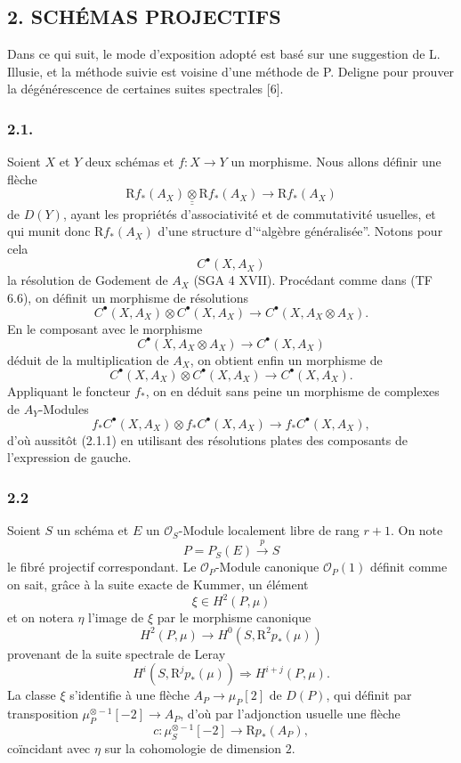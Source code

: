 \subsection*{2. SCHÉMAS PROJECTIFS}

Dans ce qui suit, le mode d'exposition adopté est basé sur une suggestion de L. Illusie, et la méthode suivie est voisine d'une méthode de P. Deligne pour prouver la dégénérescence de certaines suites spectrales [6].

\subsubsection*{2.1.}
Soient $X$ et $Y$ deux schémas et $f:X\to Y$ un morphisme. Nous allons définir une flèche
\[
\mathrm{R} f_*(A_X)\mathbin{\underline{\underline{\otimes}}} \mathrm{R} f_*(A_X)\longrightarrow \mathrm{R} f_*(A_X)
\tag{2.1.1}
\]
de $D(Y)$, ayant les propriétés d'associativité et de commutativité usuelles, et qui munit donc $\mathrm{R} f_*(A_X)$ d'une structure d'``algèbre généralisée''. Notons pour cela
\[
C^{\bullet}(X,A_X)
\]
la
résolution de Godement de $A_X$ (SGA 4 XVII). Procédant comme dans (TF 6.6), on définit un morphisme de résolutions
\[
C^{\bullet}(X,A_X)\otimes C^{\bullet}(X,A_X)\longrightarrow C^{\bullet}(X,A_X\otimes A_X).
\]
En le composant avec le morphisme
\[
C^{\bullet}(X,A_X\otimes A_X)\longrightarrow C^{\bullet}(X,A_X)
\]
déduit de la multiplication de $A_X$, on obtient enfin un morphisme de
\[
C^{\bullet}(X,A_X)\otimes C^{\bullet}(X,A_X)\longrightarrow C^{\bullet}(X,A_X).
\tag{2.1.2}
\]
Appliquant le foncteur $f_*$, on en déduit sans peine un morphisme de complexes de $A_Y$-Modules
\[
f_*C^{\bullet}(X,A_X)\otimes f_*C^{\bullet}(X,A_X)\longrightarrow f_*C^{\bullet}(X,A_X),
\]
d'où aussitôt (2.1.1) en utilisant des résolutions plates des composants de l'expression de gauche.

\subsubsection*{2.2}
Soient $S$ un schéma et $E$ un $\mathcal{O}_S$-Module localement libre de rang $r+1$. On note
\[
P=P_S(E)\xrightarrow{p}S
\]
le fibré projectif correspondant. Le $\mathcal{O}_P$-Module canonique $\mathcal{O}_P(1)$ définit comme on sait, grâce à la suite exacte de Kummer, un élément
\[
\xi\in H^2(P,\mu)
\]
et on notera $\eta$ l'image de $\xi$ par le morphisme canonique
\[
H^2(P,\mu)\longrightarrow H^0(S,\mathrm{R}^2p_*(\mu))
\]
provenant de la suite spectrale de Leray
\[
H^i(S,\mathrm{R}^jp_*(\mu))\Rightarrow H^{i+j}(P,\mu).
\]
La classe $\xi$ s'identifie à une flèche $A_P\to\mu_P[2]$ de $D(P)$, qui définit par transposition $\mu_P^{\otimes -1}[-2]\to A_P$, d'où par l'adjonction usuelle une flèche
\[
c:\mu_S^{\otimes -1}[-2]\longrightarrow \mathrm{R} p_*(A_P),
\]
coïncidant avec $\eta$ sur la cohomologie de dimension $2$.

